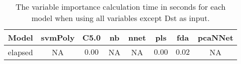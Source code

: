 \begin{table}[!ht]
	\centering
	\begin{tabular}{|c|c|c|c|c|c|c|c|}
		\hline
		Model & svmPoly & C5.0 & nb & nnet & pls & fda & pcaNNet \\ \hline
		elapsed & NA & $0.00$ & NA & NA & $0.00$ & $0.02$ & NA \\ \hline
	\end{tabular}
	\caption{The variable importance calculation time in seconds for each model when using all variables except Dst as input.}
	\label{tab:time:reverse:noDst:importance}
\end{table}
